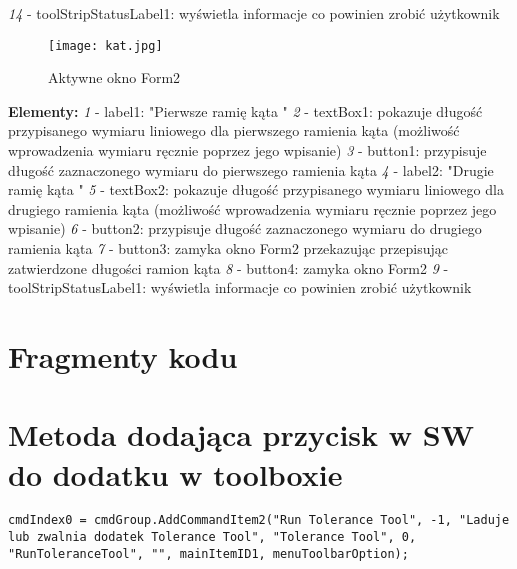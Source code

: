 \documentclass[11pt,a4paper]{article}
\begin{document}
\newline
\newline
\textit{14} - toolStripStatusLabel1: wyświetla informacje co powinien zrobić użytkownik 
\newpage
\begin{figure}[h!]
\centering
\texttt{[image: kat.jpg]}
\caption{Aktywne okno Form2}
\end{figure}
\textbf{Elementy: }
\newline
\newline
\textit{1} - label1: "Pierwsze ramię kąta "
\newline
\newline
\textit{2} - textBox1: pokazuje długość przypisanego wymiaru liniowego dla pierwszego ramienia kąta (możliwość wprowadzenia wymiaru ręcznie poprzez jego wpisanie)
\newline
\newline
\textit{3} - button1: przypisuje długość zaznaczonego wymiaru do pierwszego ramienia kąta
\newline
\newline
\textit{4} - label2: "Drugie ramię kąta "
\newline
\newline
\textit{5} - textBox2: pokazuje długość przypisanego wymiaru liniowego dla drugiego ramienia kąta (możliwość wprowadzenia wymiaru ręcznie poprzez jego wpisanie)
\newline 
\newline
\textit{6} - button2: przypisuje długość zaznaczonego wymiaru do drugiego ramienia kąta
\newline
\newline
\textit{7} - button3: zamyka okno Form2 przekazując przepisując zatwierdzone długości ramion kąta
\newline
\newline
\textit{8} - button4: zamyka okno Form2
\newline
\newline
\textit{9} - toolStripStatusLabel1: wyświetla informacje co powinien zrobić użytkownik  
\newpage
\section{Fragmenty kodu}
\section*{Metoda dodająca przycisk w SW do dodatku w toolboxie}
\begin{lstlisting}
cmdIndex0 = cmdGroup.AddCommandItem2("Run Tolerance Tool", -1, "Laduje lub zwalnia dodatek Tolerance Tool", "Tolerance Tool", 0, "RunToleranceTool", "", mainItemID1, menuToolbarOption); 
\end{lstlisting}
\end{document}
